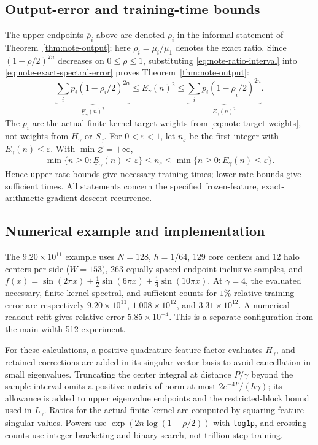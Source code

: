 \subsection{Output-error and training-time bounds}
The upper endpoints $\overline\rho_i$ above are denoted $\rho_i$
in the informal statement of Theorem~\ref{thm:note-output};
here $\rho_i=\mu_i/\mu_1$ denotes the exact ratio. Since $(1-\rho/2)^{2n}$ decreases on
$0\le\rho\le1$, substituting
\eqref{eq:note-ratio-interval} into
\eqref{eq:note-exact-spectral-error} proves Theorem~\ref{thm:note-output}:
\begin{equation}
 \underbrace{\sum_i p_i(1-\overline\rho_i/2)^{2n}}_{\underline E_\gamma(n)^2}
 \le E_\gamma(n)^2\le
 \underbrace{\sum_i p_i(1-\underline\rho_i/2)^{2n}}_{\overline E_\gamma(n)^2}.
 \label{eq:note-error-sandwich}
\end{equation}
The $p_i$ are the actual finite-kernel target weights from
\eqref{eq:note-target-weights}, not weights from $H_\gamma$ or $S_\gamma$.
For $0<\varepsilon<1$, let $n_\varepsilon$ be the first integer with
$E_\gamma(n)\le\varepsilon$. With $\min\varnothing=+\infty$,
\begin{equation}
 \min\{n\ge0:\underline E_\gamma(n)\le\varepsilon\}
 \le n_\varepsilon\le
 \min\{n\ge0:\overline E_\gamma(n)\le\varepsilon\}.
 \label{eq:note-step-interval}
\end{equation}
Hence upper rate bounds give necessary training times; lower rate bounds
give sufficient times. All statements concern the specified frozen-feature,
exact-arithmetic gradient descent recurrence.

\subsection{Numerical example and implementation}
\label{app:note-step-example}
The $9.20\times10^{11}$ example uses $N=128$, $h=1/64$, 129 core
centers and 12 halo centers per side ($W=153$), 263 equally spaced
endpoint-inclusive samples, and
$f(x)=\sin(2\pi x)+\tfrac12\sin(6\pi x)+\tfrac14\sin(10\pi x)$.
At $\gamma=4$, the evaluated necessary, finite-kernel spectral, and
sufficient counts for $1\%$ relative training error are respectively
$9.20\times10^{11}$, $1.008\times10^{12}$, and $3.31\times10^{12}$.
A numerical readout refit gives relative error $5.85\times10^{-4}$.
This is a separate configuration from the main width-512 experiment.

For these calculations, a positive quadrature feature factor evaluates
$H_\gamma$, and retained corrections are added in its singular-vector
basis to avoid cancellation in small eigenvalues. Truncating the center
integral at distance $P/\gamma$ beyond the sample interval omits a positive
matrix of norm at most $2e^{-4P}/(h\gamma)$; its allowance is added to
upper eigenvalue endpoints and the restricted-block bound used in
$L_\gamma$. Ratios for the actual finite kernel are computed by
squaring feature singular values. Powers use
$\exp(2n\log(1-\rho/2))$ with \texttt{log1p}, and crossing counts use
integer bracketing and binary search, not trillion-step training.

